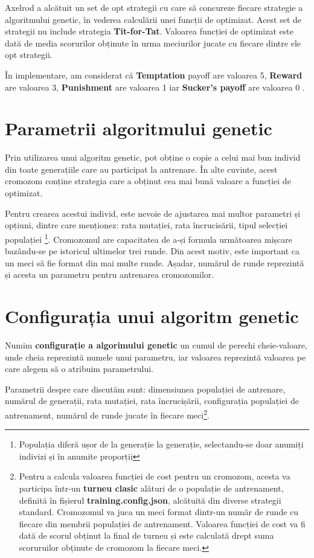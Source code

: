 Axelrod a alcătuit un set de opt strategii cu care să concureze fiecare strategie a algoritmului genetic, în vederea calculării unei funcții de optimizat. Acest set de strategii nu include strategia \textbf{Tit-for-Tat}. Valoarea funcției de optimizat este dată de media scorurilor obținute în urma meciurilor jucate cu fiecare dintre ele opt strategii.

În implementare, am considerat că \textbf{Temptation} payoff are valoarea 5, \textbf{Reward} are valoarea 3, \textbf{Punishment} are valoarea 1 iar \textbf{Sucker's payoff} are valoarea 0 \cite{optimal_strategies}. 

\section {Parametrii algoritmului genetic}

Prin utilizarea unui algoritm genetic, pot obține o copie a celui mai bun individ din toate generațiile care au participat la antrenare. În alte cuvinte, acest cromozom conține strategia care a obținut cea mai bună valoare a funcției de optimizat. 

Pentru crearea acestui individ, este nevoie de ajustarea mai multor parametri și opțiuni, dintre care menționez: rata mutației, rata încrucisării, tipul selecției populației \footnote{Populația diferă ușor de la generație la generație, selectandu-se doar anumiți indivizi și în anumite proporții}. Cromozomul are capacitatea de a-și formula următoarea mișcare bazându-se pe istoricul ultimelor trei runde. Din acest motiv, este important ca un meci să fie format din mai multe runde. Așadar, numărul de runde reprezintă și acesta un parametru pentru antrenarea cromozomilor. 

\section{Configurația unui algoritm genetic}

Numim \textbf{configurație a algorimului genetic} un cumul de perechi cheie-valoare, unde cheia reprezintă numele unui parametru, iar valoarea reprezintă valoarea pe care alegem să o atribuim parametrului.

Parametrii despre care discutăm sunt: dimensiunea populației de antrenare, numărul de generații, rata mutației, rata încrucișării, configurația populației de antrenament, numărul de runde jucate în fiecare meci\footnote{Pentru a calcula valoarea funcției de cost pentru un cromozom, acesta va participa într-un \textbf{turneu clasic} alături de o populație de antrenament, definită în fișierul \textbf{training.config.json}, alcătuită din diverse strategii standard. Cromozomul va juca un meci format dintr-un număr de runde cu fiecare din membrii populației de antrenament. Valoarea funcției de cost va fi dată de scorul obținut la final de turneu și este calculată drept suma scoruruilor obținute de cromozom la fiecare meci.}.  

